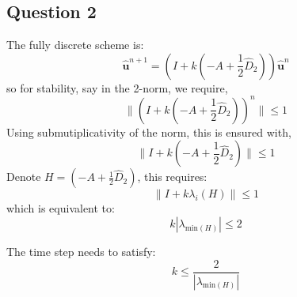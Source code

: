 \documentclass[12pt, fullpage,letterpaper]{article}
\begin{document}
\subsection{Question 2}
The fully discrete scheme is:
\begin{equation}
     \hat{\mathbf{u}}^{n+1} = (I + k( - A + \frac{1}{2} \hat{D}_2 )) \hat{\mathbf{u}}^{n} 
\end{equation}
so for stability, say in the 2-norm, we require,
\begin{equation}
     \| (I + k( - A + \frac{1}{2} \hat{D}_2 ))^n\| \leq 1
\end{equation}
Using submutiplicativity of the norm, this is ensured with,
\begin{equation}
     \| I + k( - A + \frac{1}{2} \hat{D}_2 )\| \leq 1
\end{equation}
Denote $H= ( - A + \frac{1}{2} \hat{D}_2 )$, this requires:
\begin{equation}
     \| I + k\lambda_i(H)\| \leq 1
\end{equation}
which is equivalent to:
\begin{equation}
k |\lambda_{\text{min}(H)}| \leq 2
\end{equation}

The time step needs to satisfy:
\begin{equation}
k \leq \frac{2}{|\lambda_{\text{min}(H)}|}
\end{equation}

\end{document}
